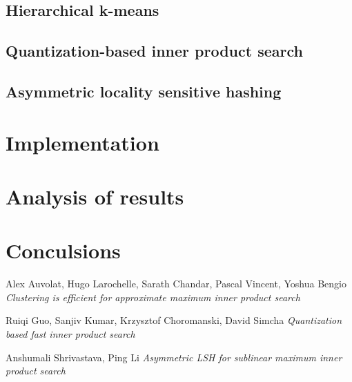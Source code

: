 \documentclass[12pt]{article}
\begin{document}
	\subsection{Hierarchical k-means}
	
	\subsection{Quantization-based inner product search}
	
	\subsection{Asymmetric locality sensitive hashing}
	
\section{Implementation}
	
\section{Analysis of results}
	
\section{Conculsions}
	
	\begin{thebibliography}{90}
		Alex Auvolat, Hugo Larochelle, Sarath Chandar, Pascal Vincent, Yoshua Bengio
		\textit{Clustering is efficient for approximate maximum inner product search}

		Ruiqi Guo, Sanjiv Kumar, Krzysztof Choromanski, David Simcha
		\textit{Quantization based fast inner product search}

		Anshumali Shrivastava, Ping Li
		\textit{Asymmetric LSH for sublinear maximum inner product search}
	\end{thebibliography}
\end{document}
